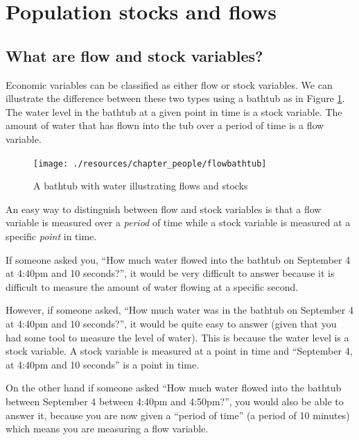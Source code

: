 \documentclass[
]{book}
\begin{document}
\hypertarget{population-stocks-and-flows}{%
\section{Population stocks and flows}\label{population-stocks-and-flows}}

\hypertarget{what-are-flow-and-stock-variables}{%
\subsection{What are flow and stock variables?}\label{what-are-flow-and-stock-variables}}

Economic variables can be classified as either flow or stock variables. We can illustrate the difference between these two types using a bathtub as in Figure \ref{fig:baththub}. The water level in the bathtub at a given point in time is a stock variable. The amount of water that has flown into the tub over a period of time is a flow variable.

\begin{figure}

{\centering \texttt{[image: ./resources/chapter\_people/flowbathtub]} 

}

\caption{A bathtub with water illustrating flows and stocks}\label{fig:baththub}
\end{figure}

An easy way to distinguish between flow and stock variables is that a flow variable is measured over a \emph{period} of time while a stock variable is measured at a specific \emph{point} in time.

If someone asked you, ``How much water flowed into the bathtub on September 4 at 4:40pm and 10 seconds?'', it would be very difficult to answer because it is difficult to measure the amount of water flowing at a specific second.

However, if someone asked, ``How much water was in the bathtub on September 4 at 4:40pm and 10 seconds?'', it would be quite easy to answer (given that you had some tool to measure the level of water). This is because the water level is a stock variable. A stock variable is measured at a point in time and ``September 4, at 4:40pm and 10 seconds'' is a point in time.

On the other hand if someone asked ``How much water flowed into the bathtub between September 4 between 4:40pm and 4:50pm?'', you would also be able to answer it, because you are now given a ``period of time'' (a period of 10 minutes) which means you are measuring a flow variable.
\end{document}
